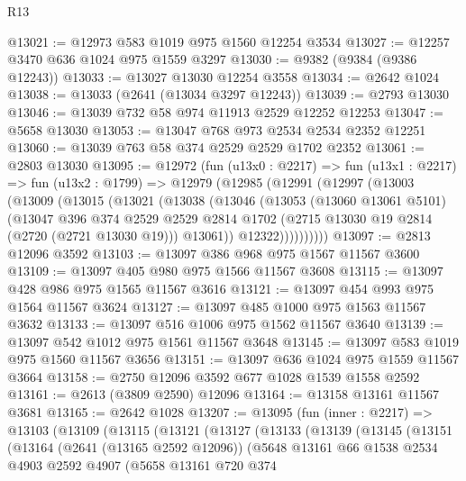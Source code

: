 \begin{lexlean}{R13}
\begin{coremodule}
@13021 := @12973 @583 @1019 @975 @1560 @12254 @3534
@13027 := @12257 @3470 @636 @1024 @975 @1559 @3297
@13030 := @9382 (@9384 (@9386 @12243))
@13033 := @13027 @13030 @12254 @3558
@13034 := @2642 @1024
@13038 := @13033 (@2641 (@13034 @3297 @12243))
@13039 := @2793 @13030
@13046 := @13039 @732 @58 @974 @11913 @2529 @12252 @12253
@13047 := @5658 @13030
@13053 := @13047 @768 @973 @2534 @2534 @2352 @12251
@13060 := @13039 @763 @58 @374 @2529 @2529 @1702 @2352
@13061 := @2803 @13030
@13095 := @12972
    (fun (u13x0 : @2217) =>
    fun (u13x1 : @2217) =>
    fun (u13x2 : @1799) =>
    @12979
      (@12985
        (@12991
          (@12997
            (@13003
              (@13009
                (@13015
                  (@13021
                    (@13038
                      (@13046
                        (@13053
                          (@13060 @13061 @5101)
                          (@13047
                            @396
                            @374
                            @2529
                            @2529
                            @2814
                            @1702
                            (@2715 @13030 @19 @2814 (@2720 (@2721 @13030 @19)))
                            @13061))
                        @12322))))))))))
@13097 := @2813 @12096 @3592
@13103 := @13097 @386 @968 @975 @1567 @11567 @3600
@13109 := @13097 @405 @980 @975 @1566 @11567 @3608
@13115 := @13097 @428 @986 @975 @1565 @11567 @3616
@13121 := @13097 @454 @993 @975 @1564 @11567 @3624
@13127 := @13097 @485 @1000 @975 @1563 @11567 @3632
@13133 := @13097 @516 @1006 @975 @1562 @11567 @3640
@13139 := @13097 @542 @1012 @975 @1561 @11567 @3648
@13145 := @13097 @583 @1019 @975 @1560 @11567 @3656
@13151 := @13097 @636 @1024 @975 @1559 @11567 @3664
@13158 := @2750 @12096 @3592 @677 @1028 @1539 @1558 @2592
@13161 := @2613 (@3809 @2590) @12096
@13164 := @13158 @13161 @11567 @3681
@13165 := @2642 @1028
@13207 := @13095
    (fun (inner : @2217) =>
    @13103
      (@13109
        (@13115
          (@13121
            (@13127
              (@13133
                (@13139
                  (@13145
                    (@13151
                      (@13164
                        (@2641 (@13165 @2592 @12096))
                        (@5648
                          @13161
                          @66
                          @1538
                          @2534
                          @4903
                          @2592
                          @4907
                          (@5658
                            @13161
                            @720
                            @374

\end{coremodule}
\end{lexlean}
